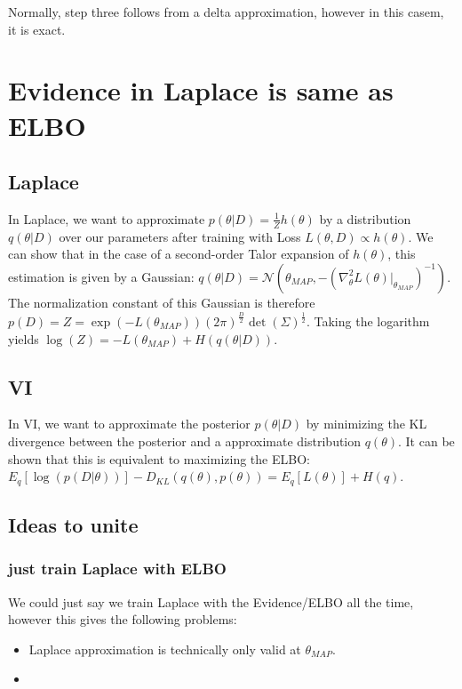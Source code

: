 \documentclass[a4paper]{scrartcl}
\begin{document}
    Normally, step three follows from a delta approximation, however in this casem, it is exact.
      
\section{Evidence in Laplace is same as ELBO}
    \subsection{Laplace}
      In Laplace, we want to approximate $p(\theta \vert D) =
      \frac{1}{Z}h(\theta)$ by a distribution $q(\theta \vert D)$ over our
      parameters after training with Loss $L(\theta, D) \propto h(\theta)$. We
      can show that in the case of a second-order Talor expansion of
      $h(\theta)$, this estimation is given by a Gaussian: $q(\theta \vert D) =
      \mathcal{N}(\theta_{MAP}, -(\nabla^2_\theta
      L(\theta)\vert_{\theta_{MAP}})^{-1})$. The normalization constant of this
      Gaussian is therefore $p(D) = Z =
      \exp(-L(\theta_{MAP}))(2\pi)^{\frac{D}{2}} \det(\Sigma)^{\frac{1}{2}}$. Taking the logarithm yields $\log(Z) = -L(\theta_{MAP}) + H(q(\theta \vert D))$.

    \subsection{VI}
      In VI, we want to approximate the posterior $p(\theta \vert D)$ by
      minimizing the KL divergence between the posterior and a approximate
      distribution $q(\theta)$. It can be shown that this is equivalent to maximizing the ELBO:
      $E_q[\log(p(D \vert \theta))] - D_{KL}(q(\theta), p(\theta)) = E_q[L(\theta)] + H(q)$.

    \subsection{Ideas to unite}
      \subsubsection{just train Laplace with ELBO}
        We could just say we train Laplace with the Evidence/ELBO all the time,
        however this gives the following problems:
        \begin{itemize}
          \item Laplace approximation is technically only valid at $\theta_{MAP}$.
          \item 
        \end{itemize}
\end{document}

